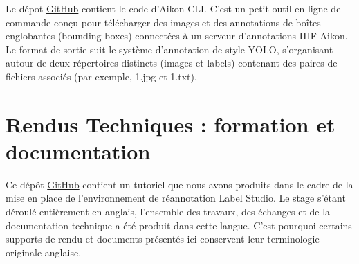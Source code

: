 Le dépot \href{https://github.com/Anarchiviste/aikoncli/tree/main}{GitHub} contient le code d'Aikon CLI. C'est un petit outil en ligne de commande conçu pour télécharger des images et des annotations de boîtes englobantes (bounding boxes) connectées à un serveur d'annotations IIIF Aikon. Le format de sortie suit le système d'annotation de style YOLO, s'organisant autour de deux répertoires distincts (images et labels) contenant des paires de fichiers associés (par exemple, 1.jpg et 1.txt).


 \chapter[Annexes : Formations]{Rendus Techniques : formation et documentation}
 
 Ce dépôt \href{https://github.com/Anarchiviste/GenHisDoc_Lab/edit/main/labelstudio_reannotation.md}{GitHub} contient un tutoriel que nous avons produits dans le cadre de la mise en place de l'environnement de réannotation Label Studio. Le stage s'étant déroulé entièrement en anglais, l'ensemble des travaux, des échanges et de la documentation technique a été produit dans cette langue. C'est pourquoi certains supports de rendu et documents présentés ici conservent leur terminologie originale anglaise.
 
 \label{chap:guideline}
  
 

